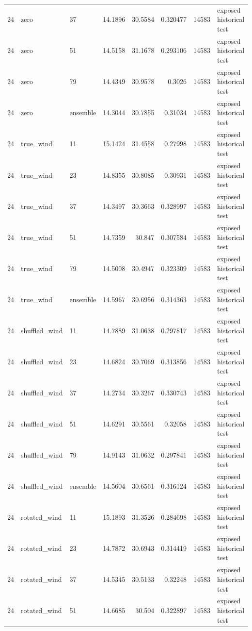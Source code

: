 \begin{tabular}{rllrrrrl}
24 & zero & 37 & 14.1896 & 30.5584 & 0.320477 & 14583 & exposed historical test \\
24 & zero & 51 & 14.5158 & 31.1678 & 0.293106 & 14583 & exposed historical test \\
24 & zero & 79 & 14.4349 & 30.9578 & 0.3026 & 14583 & exposed historical test \\
24 & zero & ensemble & 14.3044 & 30.7855 & 0.31034 & 14583 & exposed historical test \\
24 & true\_wind & 11 & 15.1424 & 31.4558 & 0.27998 & 14583 & exposed historical test \\
24 & true\_wind & 23 & 14.8355 & 30.8085 & 0.30931 & 14583 & exposed historical test \\
24 & true\_wind & 37 & 14.3497 & 30.3663 & 0.328997 & 14583 & exposed historical test \\
24 & true\_wind & 51 & 14.7359 & 30.847 & 0.307584 & 14583 & exposed historical test \\
24 & true\_wind & 79 & 14.5008 & 30.4947 & 0.323309 & 14583 & exposed historical test \\
24 & true\_wind & ensemble & 14.5967 & 30.6956 & 0.314363 & 14583 & exposed historical test \\
24 & shuffled\_wind & 11 & 14.7889 & 31.0638 & 0.297817 & 14583 & exposed historical test \\
24 & shuffled\_wind & 23 & 14.6824 & 30.7069 & 0.313856 & 14583 & exposed historical test \\
24 & shuffled\_wind & 37 & 14.2734 & 30.3267 & 0.330743 & 14583 & exposed historical test \\
24 & shuffled\_wind & 51 & 14.6291 & 30.5561 & 0.32058 & 14583 & exposed historical test \\
24 & shuffled\_wind & 79 & 14.9143 & 31.0632 & 0.297841 & 14583 & exposed historical test \\
24 & shuffled\_wind & ensemble & 14.5604 & 30.6561 & 0.316124 & 14583 & exposed historical test \\
24 & rotated\_wind & 11 & 15.1893 & 31.3526 & 0.284698 & 14583 & exposed historical test \\
24 & rotated\_wind & 23 & 14.7872 & 30.6943 & 0.314419 & 14583 & exposed historical test \\
24 & rotated\_wind & 37 & 14.5345 & 30.5133 & 0.32248 & 14583 & exposed historical test \\
24 & rotated\_wind & 51 & 14.6685 & 30.504 & 0.322897 & 14583 & exposed historical test \\

\end{tabular}
